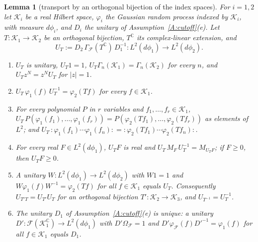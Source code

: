 \documentclass[11pt,a4paper]{article}
\theoremstyle{plain}
\newtheorem{lemma}[theorem]{Lemma}
\theoremstyle{definition}
\theoremstyle{plain}
\theoremstyle{definition}
\newcommand{\C}{\mathbb{C}}
\begin{document}
\begin{lemma}[transport by an orthogonal bijection of the index spaces]\label{lem:ff-transport}
For $i=1,2$ let $\mathcal K_i$ be a real Hilbert space, $\varphi_i$ the Gaussian random process
indexed by $\mathcal K_i$, with measure $d\phi_i$, and $D_i$ the unitary of
Assumption~\ref{A:cutoff}(e).  Let $T:\mathcal K_1\to\mathcal K_2$ be an orthogonal bijection,
$T^{\C}$ its complex-linear extension, and
\[
 U_T:=D_2\,\Gamma_{\!\mathcal F}(T^{\C})\,D_1^{-1}:L^2(d\phi_1)\to L^2(d\phi_2) .
\]
\begin{enumerate}
\item[\textup{(i)}] $U_T$ is unitary, $U_T1=1$, $U_T\Gamma_n(\mathcal K_1)=\Gamma_n(\mathcal
K_2)$ for every $n$, and $U_Tz^N=z^NU_T$ for $|z|=1$.
\item[\textup{(ii)}] $U_T\,\varphi_1(f)\,U_T^{-1}=\varphi_2(Tf)$ for every $f\in\mathcal K_1$.
\item[\textup{(iii)}] For every polynomial $P$ in $r$ variables and $f_1,\dots,f_r\in
\mathcal K_1$, $U_T\,P(\varphi_1(f_1),\dots,\varphi_1(f_r))=P(\varphi_2(Tf_1),\dots,
\varphi_2(Tf_r))$ as elements of $L^2$; and $U_T\,{:}\varphi_1(f_1)\cdots\varphi_1(f_n){:}=
{:}\varphi_2(Tf_1)\cdots\varphi_2(Tf_n){:}$.
\item[\textup{(iv)}] For every real $F\in L^2(d\phi_1)$, $U_TF$ is real and
$U_T\,M_F\,U_T^{-1}=M_{U_TF}$; if $F\ge0$, then $U_TF\ge0$.
\item[\textup{(v)}] A unitary $W:L^2(d\phi_1)\to L^2(d\phi_2)$ with $W1=1$ and
$W\varphi_1(f)W^{-1}=\varphi_2(Tf)$ for all $f\in\mathcal K_1$ equals $U_T$.  Consequently
$U_{T'T}=U_{T'}U_T$ for an orthogonal bijection $T':\mathcal K_2\to\mathcal K_3$, and
$U_{T^{-1}}=U_T^{-1}$.
\item[\textup{(vi)}] The unitary $D_1$ of Assumption~\ref{A:cutoff}(e) is unique: a unitary
$D':\mathcal F(\mathcal K_1^{\C})\to L^2(d\phi_1)$ with $D'\Omega_{\mathcal F}=1$ and
$D'\varphi_{\mathcal F}(f)D'^{-1}=\varphi_1(f)$ for all $f\in\mathcal K_1$ equals $D_1$.
\end{enumerate}
\end{lemma}
\end{document}
